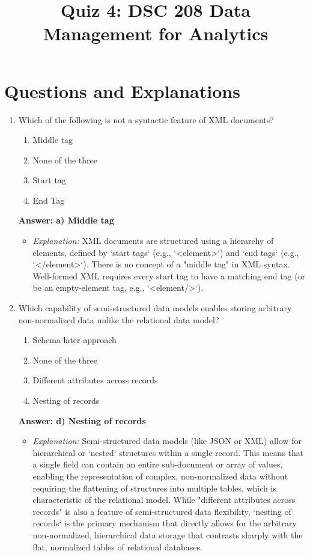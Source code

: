 \documentclass{article}
\title{Quiz 4: DSC 208 Data Management for Analytics}
\author{}
\date{}
\begin{document}
\maketitle

\section*{Questions and Explanations}

\begin{enumerate}[label=\textbf{Question \arabic*.}]

\item Which of the following is not a syntactic feature of XML documents?
    \begin{enumerate}[label=\alph*)]
        \item Middle tag
        \item None of the three
        \item Start tag
        \item End Tag
    \end{enumerate}
    \textbf{Answer: a) Middle tag}
    \begin{itemize}
        \item \textit{Explanation:} XML documents are structured using a hierarchy of elements, defined by `start tags` (e.g., `<element>`) and `end tags` (e.g., `</element>`). There is no concept of a "middle tag" in XML syntax. Well-formed XML requires every start tag to have a matching end tag (or be an empty-element tag, e.g., `<element/>`).
    \end{itemize}

\item Which capability of semi-structured data models enables storing arbitrary non-normalized data unlike the relational data model?
    \begin{enumerate}[label=\alph*)]
        \item Schema-later approach
        \item None of the three
        \item Different attributes across records
        \item Nesting of records
    \end{enumerate}
    \textbf{Answer: d) Nesting of records}
    \begin{itemize}
        \item \textit{Explanation:} Semi-structured data models (like JSON or XML) allow for hierarchical or `nested` structures within a single record. This means that a single field can contain an entire sub-document or array of values, enabling the representation of complex, non-normalized data without requiring the flattening of structures into multiple tables, which is characteristic of the relational model. While "different attributes across records" is also a feature of semi-structured data flexibility, `nesting of records` is the primary mechanism that directly allows for the arbitrary non-normalized, hierarchical data storage that contrasts sharply with the flat, normalized tables of relational databases.
    \end{itemize}


\end{enumerate}
\end{document}
